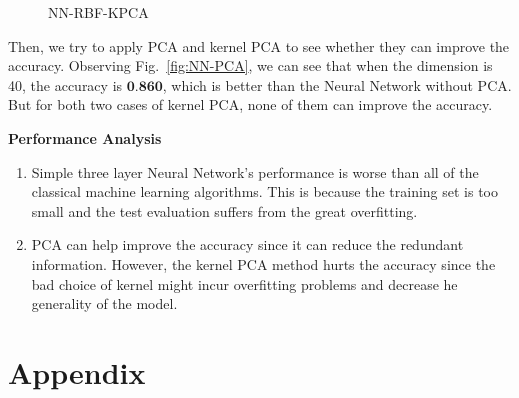 \documentclass[12pt]{article}
\begin{document}
\begin{figure}[htb]
\begin{minipage}{0.3\textwidth}
		\caption{NN-RBF-KPCA}
		\label{fig:NN-RBF-KPCA}
	\end{minipage}
\end{figure}

Then, we try to apply PCA and kernel PCA to see whether they can improve the accuracy. Observing Fig.~\ref{fig:NN-PCA}, we can see that when the dimension is 40, the accuracy is $\textbf{0.860}$, which is better than the Neural Network without PCA. But for both two cases of kernel PCA, none of them can improve the accuracy.

\textbf{Performance Analysis} 

\begin{enumerate}[label=(\roman*)]
	\item Simple three layer Neural Network's performance is worse than all of the classical machine learning algorithms. This is because the training set is too small and the test evaluation suffers from the great overfitting.
	\item PCA can help improve the accuracy since it can reduce the redundant information. However, the kernel PCA method hurts the accuracy since the bad choice of kernel might incur overfitting problems and decrease he generality of the model.
\end{enumerate}

\section{\fontsize{12}{12}\selectfont Appendix}
\begin{table}[htpb]
	\centering
	\caption*{\small{Summary of Used Algorithms}}
\end{table}

%
\end{document}
